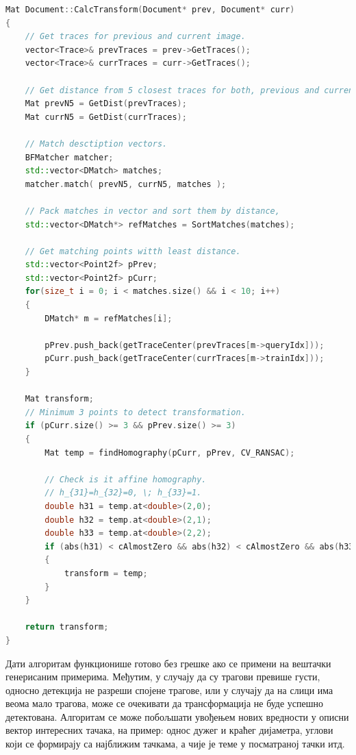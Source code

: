 \documentclass[11pt,a4paper,serbian,oneside]{book}
\begin{document}
\begin{lstlisting}[language=C++,label=lst:surf,caption=Поређење описних вектора и одређивање ротације нове слике]
Mat Document::CalcTransform(Document* prev, Document* curr)
{
    // Get traces for previous and current image.
    vector<Trace>& prevTraces = prev->GetTraces();
    vector<Trace>& currTraces = curr->GetTraces();

    // Get distance from 5 closest traces for both, previous and current image.
    Mat prevN5 = GetDist(prevTraces);
    Mat currN5 = GetDist(currTraces);

    // Match desctiption vectors.
    BFMatcher matcher;
    std::vector<DMatch> matches;
    matcher.match( prevN5, currN5, matches );

    // Pack matches in vector and sort them by distance,
    std::vector<DMatch*> refMatches = SortMatches(matches);

    // Get matching points witth least distance.
    std::vector<Point2f> pPrev;
    std::vector<Point2f> pCurr;
    for(size_t i = 0; i < matches.size() && i < 10; i++)
    {
        DMatch* m = refMatches[i];

        pPrev.push_back(getTraceCenter(prevTraces[m->queryIdx]));
        pCurr.push_back(getTraceCenter(currTraces[m->trainIdx]));
    }

    Mat transform;
    // Minimum 3 points to detect transformation.
    if (pCurr.size() >= 3 && pPrev.size() >= 3)
    {
        Mat temp = findHomography(pCurr, pPrev, CV_RANSAC);

        // Check is it affine homography.
        // h_{31}=h_{32}=0, \; h_{33}=1.
        double h31 = temp.at<double>(2,0);
        double h32 = temp.at<double>(2,1);
        double h33 = temp.at<double>(2,2);
        if (abs(h31) < cAlmostZero && abs(h32) < cAlmostZero && abs(h33 - 1) < cAlmostZero)
        {
            transform = temp;
        }
    }

    return transform;
}
\end{lstlisting}

Дати алгоритам функционише готово без грешке ако се примени на вештачки ге\-не\-ри\-са\-ним примерима. Међутим, у случају да су трагови превише густи, односно детекција не разреши спојене трагове, или у случају да на слици има веома мало трагова, може се очекивати да трансформација не буде успешно детектована. Алгоритам се може побољшати увођењем нових вредности у описни вектор интересних тачака, на пример: однос дужег и краћег дијаметра, углови који се формирају са најближим тачкама, а чије је теме у посматраној тачки итд. 
\end{document}
